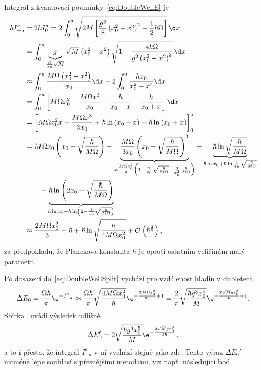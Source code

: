 \begin{solution}
\begin{enumerate}
		Integrál z kvantovací podmínky~\eqref{eq:DoubleWellE} je
		\begin{align}
			\hbar I_{-a}^{a}
				&=2\hbar I_{0}^{a}=2\int_{0}^{a}\sqrt{2M\left[\frac{g^{2}}{8}\left(x_{0}^{2}-x^{2}\right)^{2}-\frac{1}{2}\hbar\Omega\right]}\,\d x\nonumber\\
				&=\int_{0}^{a}\underbrace{g}_{\frac{\Omega}{x_{0}}\sqrt{M}}\sqrt{M}\left(x_{0}^{2}-x^{2}\right)\sqrt{1-\frac{4\hbar\Omega}{g^{2}\left(x_{0}^{2}-x^{2}\right)^{2}}}\,\d x\nonumber\\
				&\approx\int_{0}^{a}\frac{M\Omega\left(x_{0}^{2}-x^{2}\right)}{x_{0}}\d x-2\int_{0}^{a}\frac{\hbar x_{0}}{x_{0}^{2}-x^{2}}\d x\nonumber\\
				&=\int_{0}^{a}\left[M\Omega x_{0}^{2}-\frac{M\Omega x^{2}}{x_{0}}-\frac{\hbar}{x_{0}-x}-\frac{\hbar}{x_{0}+x}\right]\d x\nonumber\\
				&=\left[M\Omega x_{0}^{2}x-\frac{M\Omega x^{3}}{3x_{0}}+\hbar\ln\left(x_{0}-x\right)-\hbar\ln\left(x_{0}+x\right)\right]_{0}^{a}\nonumber\\
				&=M\Omega x_{0}\left(x_{0}-\sqrt{\frac{\hbar}{M\Omega}}\right)
					-\underbrace{\frac{M\Omega}{3x_{0}}\left(x_{0}-\sqrt{\frac{\hbar}{M\Omega}}\right)^{3}}_{\approx\frac{M\Omega x_{0}^{2}}{3}\left(1-\frac{3}{x_{0}}\sqrt{\frac{\hbar}{M\Omega}}+\frac{3}{x_{0}^{2}}\frac{\hbar}{M\Omega}\right)}
					+\underbrace{\hbar\ln{\sqrt{\frac{\hbar}{M\Omega}}}}_{\hbar\ln{x_{0}}+\hbar\ln{\frac{1}{x_{0}}\sqrt{\frac{\hbar}{M\Omega}}}}\nonumber\\
				&\qquad-\underbrace{\hbar\ln{\left(2x_{0}-\sqrt{\frac{\hbar}{M\Omega}}\right)}}_{\hbar\ln{x_{0}}+\hbar\ln\left(2-\frac{1}{x_{0}}\sqrt{\frac{\hbar}{M\Omega}}\right)}\nonumber\\
				&\approx\frac{2M\Omega x_{0}^{2}}{3}-\hbar+\hbar\ln\sqrt{\frac{\hbar}{4M\Omega x_{0}^{2}}}+\mathcal{O}\left(\hbar^{\frac{2}{3}}\right),
		\end{align}
		za předpokladu, že Planckova konstanta $\hbar$ je oproti ostatním veličinám malý parametr.
		
		Po dosazení do~\eqref{eq:DoubleWellSplit} vychází pro vzdálenost hladin v dubletech
		\begin{equation}
			\Delta E_{0}
				=\frac{\Omega\hbar}{\pi}\e^{-I_{-a}^{a}}\approx\frac{\Omega\hbar}{\pi}\sqrt{\frac{4M\Omega x_{0}^{2}}{\hbar}}\e^{-\frac{2M\Omega x_{0}^{2}}{3\hbar}+1}
				=\frac{2}{\pi}\sqrt{\frac{\hbar g^{3}x_{0}^{5}}{M}}\e^{-\frac{2\sqrt{M}g x_{0}^{3}}{3\hbar}+1}.
		\end{equation}
		Sbírka~\cite{Cini2012} uvádí výsledek odlišně
		\begin{equation}
			\Delta E_{0}'=2\sqrt{\frac{\hbar g^{3}x_{0}^{5}}{M}}\e^{-\frac{2\sqrt{M}g x_{0}^{3}}{3\hbar}}\,,
		\end{equation}
		a to i přesto, že integrál $I_{-a}^{a}$ v ní vychází stejně jako zde.
		Tento výraz $\Delta E_{0}'$ nicméně lépe souhlasí s přesnějšími metodami, viz např. následující bod.
			

\end{enumerate}
\end{solution}
